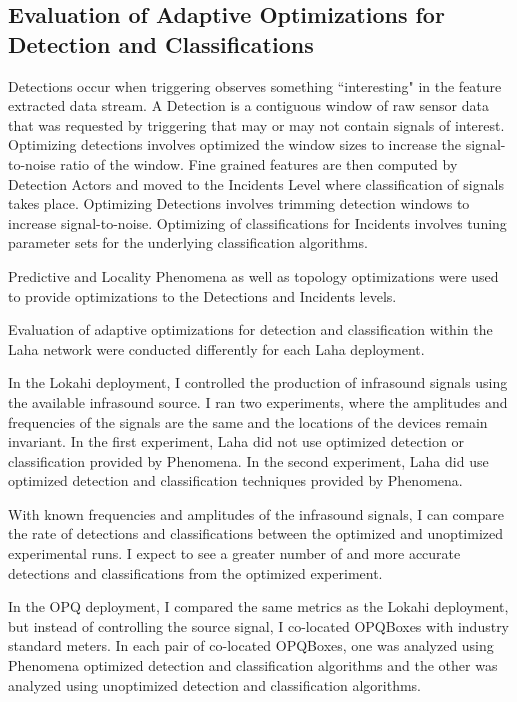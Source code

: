 \subsection{Evaluation of Adaptive Optimizations for Detection and Classifications}
Detections occur when triggering observes something ``interesting" in the feature extracted data stream. A Detection is a contiguous window of raw sensor data that was requested by triggering that may or may not contain signals of interest. Optimizing detections involves optimized the window sizes to increase the signal-to-noise ratio of the window. Fine grained features are then computed by Detection Actors and moved to the Incidents Level where classification of signals takes place. Optimizing Detections involves trimming detection windows to increase signal-to-noise. Optimizing of classifications for Incidents involves tuning parameter sets for the underlying classification algorithms. 

Predictive and Locality Phenomena as well as topology optimizations were used to provide optimizations to the Detections and Incidents levels. 

Evaluation of adaptive optimizations for detection and classification within the Laha network were conducted differently for each Laha deployment.

In the Lokahi deployment, I controlled the production of infrasound signals using the available infrasound source. I ran two experiments, where the amplitudes and frequencies of the signals are the same and the locations of the devices remain invariant. In the first experiment, Laha did not use optimized detection or classification provided by Phenomena. In the second experiment, Laha did use optimized detection and classification techniques provided by Phenomena. 

With known frequencies and amplitudes of the infrasound signals, I can compare the rate of detections and classifications between the optimized and unoptimized experimental runs. I expect to see a greater number of and more accurate detections and classifications from the optimized experiment.

In the OPQ deployment, I compared the same metrics as the Lokahi deployment, but instead of controlling the source signal, I co-located OPQBoxes with industry standard meters. In each pair of co-located OPQBoxes, one was analyzed using Phenomena optimized detection and classification algorithms and the other was analyzed using unoptimized detection and classification algorithms.

